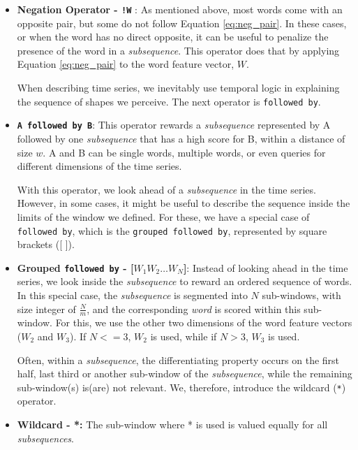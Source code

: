 \begin{itemize}

\item \textbf{Negation Operator  - \texttt{!W}} : As mentioned above, most words come with an opposite pair, but some do not follow Equation \ref{eq:neg_pair}. In these cases, or when the word has no direct opposite, it can be useful to penalize the presence of the word in a \textit{subsequence}. This operator does that by applying Equation \ref{eq:neg_pair} to the word feature vector, $W$. 

When describing time series, we inevitably use temporal logic in explaining the sequence of shapes we perceive. The next operator is \texttt{followed by}.
 
\item \textbf{\texttt{A followed by B}}: This operator rewards a \textit{subsequence} represented by A followed by one \textit{subsequence} that has a high score for B, within a distance of size $w$. A and B can be single words, multiple words, or even queries for different dimensions of the time series.

With this operator, we look ahead of a \textit{subsequence} in the time series. However, in some cases, it might be useful to describe the sequence inside the limits of the window we defined. For these, we have a special case of \texttt{followed by}, which is the \texttt{grouped followed by}, represented by square brackets ([ ]). 

\item	\textbf{Grouped \texttt{followed by} - [$W_1 W_2 … W_N$]}: Instead of looking ahead in the time series, we look inside the \textit{subsequence} to reward an ordered sequence of words. In this special case, the \textit{subsequence} is segmented into $N$ sub-windows, with size integer of $\frac{N}{m}$, and the corresponding \textit{word} is scored within this sub-window. For this, we use the other two dimensions of the word feature vectors ($W_2$ and $W_3$). If $N<=3$, $W_2$ is used, while if $N>3$, $W_3$ is used.

Often, within a \textit{subsequence}, the differentiating property occurs on the first half, last third or another sub-window of the \textit{subsequence}, while the remaining sub-window(s) is(are) not relevant. We, therefore, introduce the wildcard (\texttt{*}) operator.

\item \textbf{Wildcard - *:} The sub-window where * is used is valued equally for all \textit{subsequences}.
\end{itemize}

